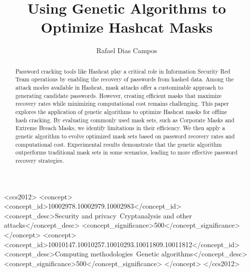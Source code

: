 \documentclass[sigconf,authordraft]{acmart}
\begin{document}
\title{Using Genetic Algorithms to Optimize Hashcat Masks}

\author{Rafael Dias Campos}


\begin{abstract}
  Password cracking tools like Hashcat play a critical role in Information Security Red Team operations by enabling the recovery of passwords from hashed data.
  Among the attack modes available in Hashcat, mask attacks offer a customizable approach to generating candidate passwords.
  However, creating efficient masks that maximize recovery rates while minimizing computational cost remains challenging.
  This paper explores the application of genetic algorithms to optimize Hashcat masks for offline hash cracking.
  By evaluating commonly used mask sets, such as Corporate Masks and Extreme Breach Masks, we identify limitations in their efficiency.
  We then apply a genetic algorithm to evolve optimized mask sets based on password recovery rates and computational cost.
  Experimental results demonstrate that the genetic algorithm outperforms traditional mask sets in some scenarios, leading to more effective password recovery strategies.
\end{abstract}

\begin{CCSXML}
  <ccs2012>
     <concept>
        <concept_id>10002978.10002979.10002983</concept_id>
        <concept_desc>Security and privacy~Cryptanalysis and other attacks</concept_desc>
        <concept_significance>500</concept_significance>
        </concept>
    <concept>
        <concept_id>10010147.10010257.10010293.10011809.10011812</concept_id>
        <concept_desc>Computing methodologies~Genetic algorithms</concept_desc>
        <concept_significance>500</concept_significance>
        </concept>
  </ccs2012>
\end{CCSXML}
\end{document}
